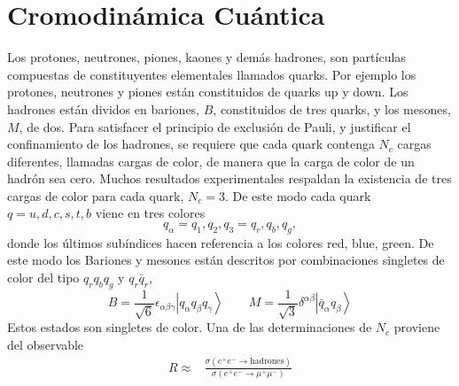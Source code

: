 


\section{Cromodinámica Cuántica}
\label{sec:inter-fuert}
Los protones, neutrones, piones, kaones y demás hadrones, son partículas compuestas de constituyentes elementales llamados quarks. Por ejemplo los protones, neutrones y piones están constituidos de quarks up y down. Los hadrones están dividos en  bariones, $B$, constituidos de tres quarks, y los mesones, $M$, de dos. Para satisfacer el principio de exclusión de Pauli, y justificar el confinamiento de los hadrones, se requiere que cada quark contenga $N_c$ cargas diferentes, llamadas cargas de color, de manera que la carga de color de un hadrón sea cero. Muchos resultados experimentales respaldan la existencia de tres cargas de color para cada quark, $N_c=3$. De este modo cada quark $q=u,d,c,s,t,b$ viene en tres colores
\begin{equation}
  q_\alpha=q_1,q_2,q_3=q_r,q_b,q_g,
\end{equation}
donde los últimos subíndices hacen referencia a los colores red, blue, green. De este modo los Bariones y mesones están descritos por combinaciones singletes de color del tipo $q_r q_b q_g$ y $q_r\bar{q}_r$,
\begin{equation}
\label{eq:199qft}
  B=\frac{1}{\sqrt{6}}\epsilon_{\alpha\beta\gamma}
  \left|q_\alpha q_\beta q_\gamma\right\rangle \qquad M=\frac{1}{\sqrt{3}}\delta^{\alpha\beta}\left|\bar{q}_{\alpha}q_\beta\right\rangle
\end{equation}
Estos estados son singletes de color.
Una de las determinaciones de $N_c$ proviene del observable
\begin{align}
  R\approx&\frac{\sigma(e^+e^-\to\text{hadrones})}{\sigma(e^+e^-\to\mu^+\mu^-)}
\end{align}


